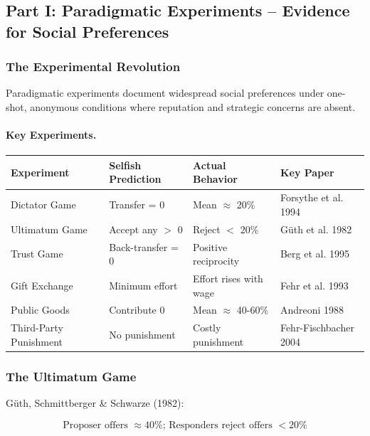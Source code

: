 \subsection{Part I: Paradigmatic Experiments – Evidence for Social Preferences}

\subsubsection{The Experimental Revolution}

Paradigmatic experiments document widespread social preferences under 
one-shot, anonymous conditions where reputation and strategic concerns 
are absent.

\paragraph{Key Experiments.}
\begin{center}
\renewcommand{\arraystretch}{1.3}
\begin{tabular}{|l|l|l|l|}
\hline
\textbf{Experiment} & \textbf{Selfish Prediction} & \textbf{Actual Behavior} & \textbf{Key Paper} \\
\hline
Dictator Game & Transfer = 0 & Mean $\approx$ 20\% & Forsythe et al. 1994 \\
Ultimatum Game & Accept any $>$ 0 & Reject $<$ 20\% & Güth et al. 1982 \\
Trust Game & Back-transfer = 0 & Positive reciprocity & Berg et al. 1995 \\
Gift Exchange & Minimum effort & Effort rises with wage & Fehr et al. 1993 \\
Public Goods & Contribute 0 & Mean $\approx$ 40-60\% & Andreoni 1988 \\
Third-Party Punishment & No punishment & Costly punishment & Fehr-Fischbacher 2004 \\
\hline
\end{tabular}
\end{center}

\subsubsection{The Ultimatum Game}

Güth, Schmittberger \& Schwarze (1982):

\begin{equation}
\boxed{
\text{Proposer offers } \approx 40\% \text{; Responders reject offers } < 20\%
}
\label{eq:ultimatum}
\end{equation}

